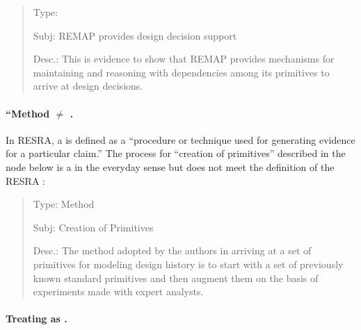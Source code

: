 \small
\begin{quote}
  \begin{itemizenoindent}
    
  \item {\sf Type}: 
    
  \item {\sf Subj}: REMAP provides design decision support
 
  \item {\sf Desc.}: This is evidence to show that REMAP provides
    mechanisms for maintaining and reasoning with dependencies among its
    primitives to arrive at design decisions.

 \end{itemizenoindent}
\end{quote}
\normalsize
{}


\paragraph{``Method \(\neq\) .}

In RESRA, a  is defined as a ``procedure or technique
used for generating evidence for a particular claim.'' The process for
``creation of primitives'' described in the node below is a  in the everyday sense but does not meet the definition of the
RESRA :

\small
\begin{quote}
  \begin{itemizenoindent}

    \item {\sf Type}: Method
 
    \item {\sf Subj}: Creation of Primitives
 
    \item {\sf Desc.}: The method adopted by the authors in arriving
      at a set of primitives for modeling design history is to start
      with a set of previously known standard primitives and then
      augment them on the basis of experiments made with expert
      analysts.

    \end{itemizenoindent}
\end{quote}
\normalsize
{}


\paragraph{Treating  as .}

